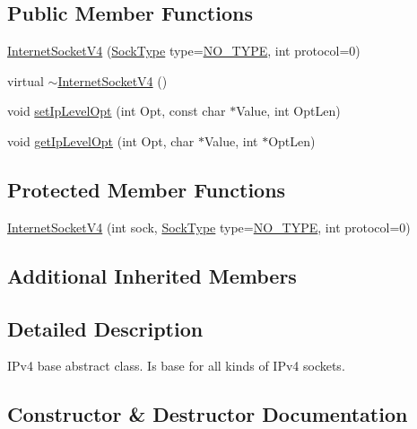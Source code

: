 \subsection*{Public Member Functions}
\begin{DoxyCompactItemize}
\item 
\hyperlink{classInternetSocketV4_a021a3ec93a3800a2fe879ec3df34a29b}{Internet\+Socket\+V4} (\hyperlink{classSocketClass_a2182dd9fee09459fabb99e6ae717f595}{Sock\+Type} type=\hyperlink{classSocketClass_a2182dd9fee09459fabb99e6ae717f595a8c7f955ea5b71498ff1d469345d813ad}{N\+O\+\_\+\+T\+Y\+PE}, int protocol=0)
\item 
virtual \hyperlink{classInternetSocketV4_af7edfb3b33ba40c6c93bfb9ffe0ce318}{$\sim$\+Internet\+Socket\+V4} ()
\item 
void \hyperlink{classInternetSocketV4_af890a3acb0a072f7da484113c1910a76}{set\+Ip\+Level\+Opt} (int Opt, const char $\ast$Value, int Opt\+Len)
\item 
void \hyperlink{classInternetSocketV4_a77bd7005098fb32f5214bbc140b99fe6}{get\+Ip\+Level\+Opt} (int Opt, char $\ast$Value, int $\ast$Opt\+Len)
\end{DoxyCompactItemize}
\subsection*{Protected Member Functions}
\begin{DoxyCompactItemize}
\item 
\hyperlink{classInternetSocketV4_ad2e60863f606afa5d1a45b413538baff}{Internet\+Socket\+V4} (int sock, \hyperlink{classSocketClass_a2182dd9fee09459fabb99e6ae717f595}{Sock\+Type} type=\hyperlink{classSocketClass_a2182dd9fee09459fabb99e6ae717f595a8c7f955ea5b71498ff1d469345d813ad}{N\+O\+\_\+\+T\+Y\+PE}, int protocol=0)
\end{DoxyCompactItemize}
\subsection*{Additional Inherited Members}


\subsection{Detailed Description}
I\+Pv4 base abstract class. Is base for all kinds of I\+Pv4 sockets. 

\subsection{Constructor \& Destructor Documentation}
\mbox{\label{classInternetSocketV4_a021a3ec93a3800a2fe879ec3df34a29b}} 
